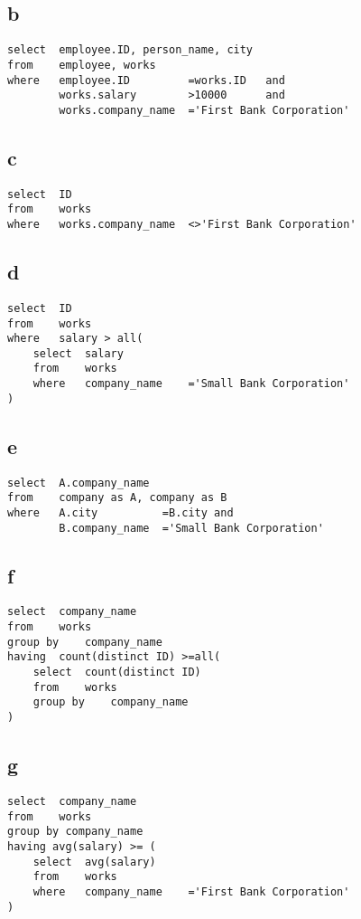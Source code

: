 \documentclass{article}
\begin{document}
    \subsection*{b}
    \begin{verbatim}
select  employee.ID, person_name, city
from    employee, works
where   employee.ID         =works.ID   and
        works.salary        >10000      and
        works.company_name  ='First Bank Corporation'
    \end{verbatim}
    \subsection*{c}
    \begin{verbatim}
select  ID
from    works
where   works.company_name  <>'First Bank Corporation'
    \end{verbatim}
    \subsection*{d}
    \begin{verbatim}
select  ID
from    works
where   salary > all(
    select  salary
    from    works
    where   company_name    ='Small Bank Corporation'
)
    \end{verbatim}
    \subsection*{e}
    \begin{verbatim}
select  A.company_name
from    company as A, company as B
where   A.city          =B.city and
        B.company_name  ='Small Bank Corporation'
    \end{verbatim}
    \subsection*{f}
    \begin{verbatim}
select  company_name
from    works
group by    company_name
having  count(distinct ID) >=all(
    select  count(distinct ID)
    from    works
    group by    company_name
)
    \end{verbatim}
    \subsection*{g}
    \begin{verbatim}
select  company_name
from    works
group by company_name
having avg(salary) >= (
    select  avg(salary)
    from    works
    where   company_name    ='First Bank Corporation'
)
    \end{verbatim}
\end{document}
